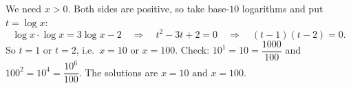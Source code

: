 We need $x>0$. Both sides are positive, so take base-$10$ logarithms and put $t=\log x$:
\[
\log x\cdot\log x=3\log x-2\quad\Longrightarrow\quad t^2-3t+2=0\quad\Longrightarrow\quad(t-1)(t-2)=0 .
\]
So $t=1$ or $t=2$, i.e.\ $x=10$ or $x=100$. Check: $10^{1}=10=\dfrac{1000}{100}$ and $100^{2}=10^4=\dfrac{10^6}{100}$. The solutions are $\boxed{x=10\text{ and }x=100}$.
